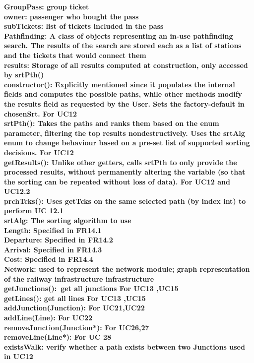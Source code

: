 \bf{GroupPass}: group ticket\\

owner: passenger who bought the pass\\
subTickets: list of tickets included in the pass\\

\bf{Pathfinding}: 
A class of objects representing an in-use pathfinding search. The results of the search are stored each as a list of stations and the tickets that would connect them\\

results: Storage of all results computed at construction, only accessed by srtPth()\\
constructor(): Explicitly mentioned since it populates the internal fields and computes the possible paths, while other methods modify the results field as requested by the User. Sets the factory-default in chosenSrt. For UC12\\
srtPth(): Takes the paths and ranks them based on the enum parameter, filtering the top results nondestructively. Uses the srtAlg enum to change behaviour based on a pre-set list of supported sorting decisions. For UC12\\
getResults(): Unlike other getters, calls srtPth to only provide the processed results, without permanently altering the variable (so that the sorting can be repeated without loss of data). For UC12 and UC12.2\\
prchTcks(): Uses getTcks on the same selected path (by index int) to perform UC 12.1\\

\bf{srtAlg}: The sorting algorithm to use\\

Length: Specified in FR14.1\\
Departure: Specified in FR14.2\\
Arrival: Specified in FR14.3\\
Cost: Specified in FR14.4\\

\bf{Network}: 
used to represent the network module; graph representation of the railway infrastructure infrastructure \\

getJunctions(): get all junctions
For UC13 ,UC15\\
getLines(): get all lines
For UC13 ,UC15\\
addJunction(Junction):
For UC21,UC22\\
addLine(Line):
For UC22\\
removeJunction(Junction*):
For UC26,27 \\
removeLine(Line*):
For UC 28\\
existsWalk: verify whether a path exists between two Junctions used in UC12\\

